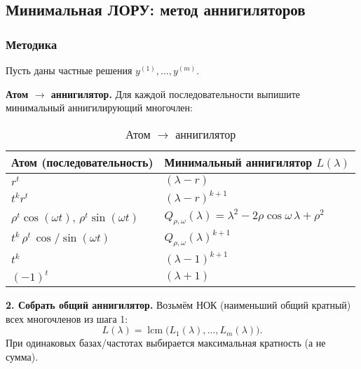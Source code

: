 \subsection{Минимальная ЛОРУ: метод аннигиляторов}\label{sec:min-lre}


\subsubsection*{Методика}

Пусть даны частные решения $y^{(1)},\ldots,y^{(m)}$.

\textbf{Атом $\to$ аннигилятор.} Для каждой последовательности выпишите минимальный аннигилирующий многочлен:
\begin{table}[h!]
\centering
\caption{Атом $\to$ аннигилятор}
\label{tab:atom-to-annihilator}
\begin{tabular}{|l|l|}
\hline
\textbf{Атом (последовательность)} & \textbf{Минимальный аннигилятор $L(\lambda)$} \\
\hline
$r^t$ & $(\lambda - r)$ \\
\hline
$t^k r^t$ & $(\lambda - r)^{k+1}$ \\
\hline
$\rho^t \cos(\omega t)$, $\rho^t \sin(\omega t)$ & $Q_{\rho,\omega}(\lambda)=\lambda^2-2\rho\cos\omega\,\lambda+\rho^2$ \\
\hline
$t^k \, \rho^t \, \cos/\sin(\omega t)$ & $Q_{\rho,\omega}(\lambda)^{k+1}$ \\
\hline
$t^k$ & $(\lambda-1)^{k+1}$ \\
\hline
$(-1)^t$ & $(\lambda+1)$ \\
\hline
\end{tabular}
\end{table}

\textbf{2. Собрать общий аннигилятор.} Возьмём НОК (наименьший общий кратный) всех многочленов из шага 1:
\[
 L(\lambda)=\operatorname{lcm}\big(L_1(\lambda),\ldots,L_m(\lambda)\big).
\]
При одинаковых базах/частотах выбирается максимальная кратность (а не сумма).

